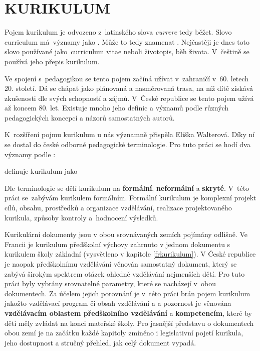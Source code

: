 \chapter{KURIKULUM}
\label{kurikulum}
Pojem kurikulum je odvozeno z latinského slova \textit{currere} tedy běžet.  Slovo curriculum má významy jako \textit{}. Může to tedy znamenat \textit{}.\citep[s.~24]{Opravilova} Nejčastěji je dnes toto slovo používané jako curriculum vitae neboli životopis, běh života. V češtině se používá jeho přepis kurikulum.

Ve spojení s pedagogikou se tento pojem začíná užívat v zahraničí v 60. letech 20. století. Dá se chápat jako plánovaná a nasměrovaná trasa, na níž dítě získává zkušenosti dle svých schopností a zájmů. V České republice se tento pojem užívá až koncem 80. let. Existuje mnoho jeho definic a významů podle různých pedagogických koncepcí a názorů samostatných autorů.

K rozšíření pojmu kurikulum u nás významně přispěla Eliška Walterová. Díky ní se dostal do české odborné pedagogické terminologie. Pro tuto práci se hodí dva významy podle \citet[s.~15]{Walterova}:


\citet{Prucha} definuje kurikulum jako 

Dle terminologie se dělí kurikulum na \textbf{formální}, \textbf{neformální} a \textbf{skryté}. V této práci se zabývám kurikulem formálním. Formální kurikulum je komplexní projekt cílů, obsahu, prostředků a organizace vzdělávání, realizace projektovaného kurikula, způsoby kontroly a hodnocení výsledků.

Kurikulární dokumenty jsou v obou srovnávaných zemích pojímány odlišně. Ve Francii je kurikulum předškolní výchovy zahrnuto v jednom dokumentu s kurikulem školy základní (vysvětleno v kapitole \ref{frkurikulum}). V České republice je naopak předškolnímu vzdělávání věnován samostatný dokument, který se zabývá širokým spektrem otázek ohledně vzdělávání nejmenších dětí. Pro tuto práci byly vybrány srovnatelné parametry, které se nacházejí v obou dokumentech. Za účelem jejich porovnání je v této práci brán pojem kurikulum jakožto vzdělávací program či obsah vzdělávání a a pozornost je věnována \textbf{vzdělávacím oblastem předškolního vzdělávání} a \textbf{kompetencím}, které by děti měly zvládat na konci mateřské školy. Pro jasnější představu o dokumentech obou zemí je na začátku každé kapitoly zmíněno i legislativní pojetí kurikula, jeho dostupnost a stručný přehled, jak celý dokument vypadá. 


